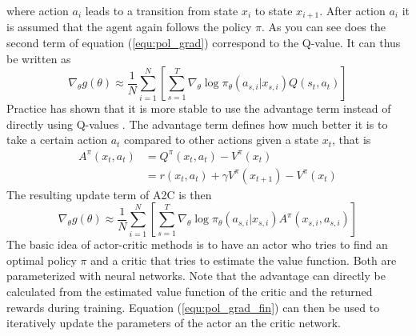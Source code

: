 \documentclass[11pt, a4paper]{article}
\begin{document}
%
where action $a_i$ leads to a transition from state $x_i$ to state $x_{i+1}$. After action $a_i$ it is assumed that the agent again follows the policy $\pi$. As you can see does the second term of equation (\ref{equ:pol_grad}) correspond to the Q-value. It can thus be written as
\begin{equation}
	\nabla_\theta g(\theta) \approx \frac{1}{N} \sum_{i=1}^{N}\left[\sum_{s=1}^{T}\nabla_\theta \log \pi_\theta(a_{s,i}|x_{s,i}) Q(s_t,a_t)\right]
\end{equation}
Practice has shown that it is more stable to use the advantage term instead of directly using Q-values \cite{A3C_1}. The advantage term defines how much better it is to take a certain action $a_t$ compared to other actions given a state $x_t$, that is
%
\begin{equation}
\begin{split}
A^\pi(x_t,a_t) & = Q^\pi(x_t,a_t) - V^\pi(x_t) \\
& = r(x_t,a_t) + \gamma V^{\pi}(x_{t+1}) - V^{\pi}(x_{t})
\end{split}
\end{equation}
%
The resulting update term of A2C is then
\begin{equation} \label{equ:pol_grad_fin}
	\nabla_\theta g(\theta) \approx \frac{1}{N} \sum_{i=1}^{N}\left[\sum_{s=1}^{T}\nabla_\theta \log \pi_\theta(a_{s,i}|x_{s,i}) A^\pi(x_{s,i},a_{s,i})\right]
\end{equation}
The basic idea of actor-critic methods is to have an actor who tries to find an optimal policy $\pi$ and a critic that tries to estimate the value function. Both are parameterized with neural networks. Note that the advantage can directly be calculated from the estimated value function of the critic and the returned rewards during training. Equation (\ref{equ:pol_grad_fin}) can then be used to iteratively update the parameters of the actor an the critic network. \newline
%
\end{document}
